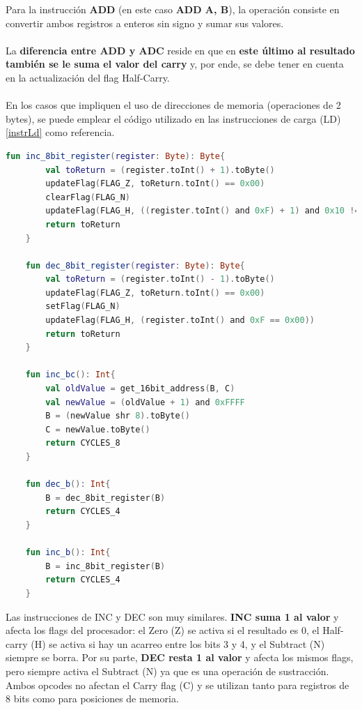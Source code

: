 Para la instrucción \textbf{ADD} (en este caso \textbf{ADD A, B}), la operación consiste en convertir ambos registros a enteros sin signo y sumar sus valores.
\\\\
La \textbf{diferencia entre ADD y ADC} reside en que en \textbf{este último al resultado también se le suma el valor del carry} y, por ende, se debe tener en cuenta en la actualización del flag Half-Carry.
\\\\
En los casos que impliquen el uso de direcciones de memoria (operaciones de 2 bytes), se puede emplear el código utilizado en las instrucciones de carga (LD) \ref{instrLd} como referencia.

\begin{lstlisting}[language=Kotlin, caption={Operaciones INC y DEC}, label={code:kotlinincdec}]
    fun inc_8bit_register(register: Byte): Byte{
        val toReturn = (register.toInt() + 1).toByte()
        updateFlag(FLAG_Z, toReturn.toInt() == 0x00)
        clearFlag(FLAG_N)
        updateFlag(FLAG_H, ((register.toInt() and 0xF) + 1) and 0x10 != 0x00)
        return toReturn
    }

    fun dec_8bit_register(register: Byte): Byte{
        val toReturn = (register.toInt() - 1).toByte()
        updateFlag(FLAG_Z, toReturn.toInt() == 0x00)
        setFlag(FLAG_N)
        updateFlag(FLAG_H, (register.toInt() and 0xF == 0x00))
        return toReturn
    }

    fun inc_bc(): Int{
        val oldValue = get_16bit_address(B, C)
        val newValue = (oldValue + 1) and 0xFFFF
        B = (newValue shr 8).toByte()
        C = newValue.toByte()
        return CYCLES_8
    }

    fun dec_b(): Int{
        B = dec_8bit_register(B)
        return CYCLES_4
    }

    fun inc_b(): Int{
        B = inc_8bit_register(B)
        return CYCLES_4
    }
\end{lstlisting}

Las instrucciones de INC y DEC son muy similares. \textbf{INC suma 1 al valor} y afecta los flags del procesador: el Zero (Z) se activa si el resultado es 0, el Half-carry (H) se activa si hay un acarreo entre los bits 3 y 4, y el Subtract (N) siempre se borra. Por su parte, \textbf{DEC resta 1 al valor} y afecta los mismos flags, pero siempre activa el Subtract (N) ya que es una operación de sustracción. Ambos opcodes no afectan el Carry flag (C) y se utilizan tanto para registros de 8 bits como para posiciones de memoria.

